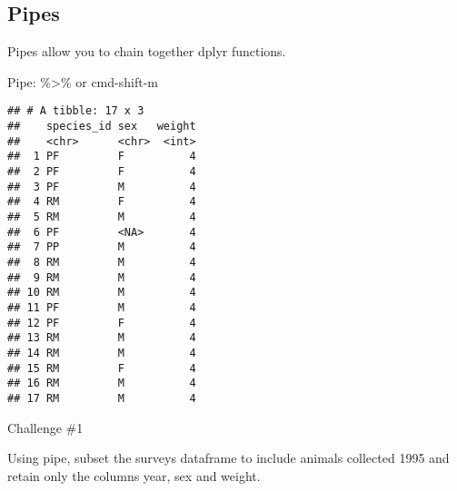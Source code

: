 \documentclass[]{article}
\newenvironment{Shaded}{\begin{snugshade}}{\end{snugshade}}
\newcommand{\KeywordTok}[1]{\textcolor[rgb]{0.13,0.29,0.53}{\textbf{#1}}}
\newcommand{\DecValTok}[1]{\textcolor[rgb]{0.00,0.00,0.81}{#1}}
\newcommand{\StringTok}[1]{\textcolor[rgb]{0.31,0.60,0.02}{#1}}
\newcommand{\CommentTok}[1]{\textcolor[rgb]{0.56,0.35,0.01}{\textit{#1}}}
\newcommand{\OperatorTok}[1]{\textcolor[rgb]{0.81,0.36,0.00}{\textbf{#1}}}
\newcommand{\NormalTok}[1]{#1}
\begin{document}
\subsection{Pipes}\label{pipes}

Pipes allow you to chain together dplyr functions.

Pipe: \%\textgreater{}\% or cmd-shift-m

\begin{Shaded}
\end{Shaded}

\begin{verbatim}
## # A tibble: 17 x 3
##    species_id sex   weight
##    <chr>      <chr>  <int>
##  1 PF         F          4
##  2 PF         F          4
##  3 PF         M          4
##  4 RM         F          4
##  5 RM         M          4
##  6 PF         <NA>       4
##  7 PP         M          4
##  8 RM         M          4
##  9 RM         M          4
## 10 RM         M          4
## 11 PF         M          4
## 12 PF         F          4
## 13 RM         M          4
## 14 RM         M          4
## 15 RM         F          4
## 16 RM         M          4
## 17 RM         M          4
\end{verbatim}

\begin{Shaded}
\end{Shaded}

Challenge \#1

Using pipe, subset the surveys dataframe to include animals collected
1995 and retain only the columns year, sex and weight.

\begin{Shaded}
\end{Shaded}
\end{document}
